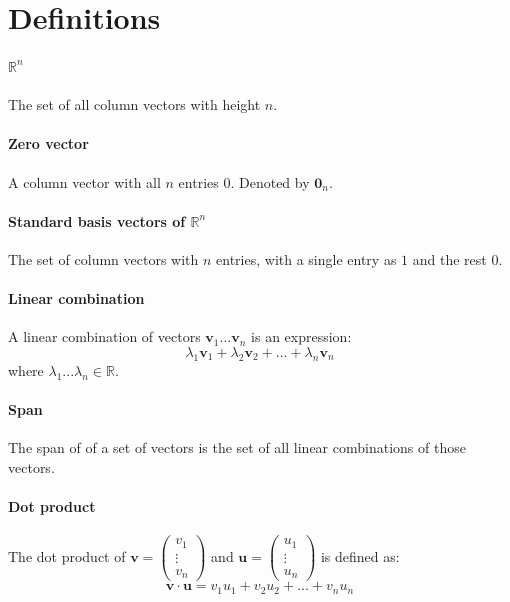 \documentclass{scrartcl}
\newcommand{\R}{\mathbb{R}}
\renewcommand{\vec}[1]{\mathbf{#1}}
\begin{document}
\section{Definitions}

\paragraph{$ \R^{n} $}
The set of all column vectors with height $ n $.

\paragraph{Zero vector}
A column vector with all $ n $ entries $ 0 $. Denoted by $ \vec{0}_{n} $.

\paragraph{Standard basis vectors of $ \R^{n} $}
The set of column vectors with $ n $ entries, with a single entry as $ 1 $ and the rest $ 0 $.

\paragraph{Linear combination}
A linear combination of vectors $ \vec{v}_{1}...\vec{v}_{n} $ is an expression:
\begin{equation}
\lambda_{1} \vec{v}_{1} + \lambda_{2} \vec{v}_{2} + ... + \lambda_{n} \vec{v}_{n}
\end{equation}
where $ \lambda_{1}...\lambda_{n} \in \R $.

\paragraph{Span}
The span of of a set of vectors is the set of all linear combinations of those vectors.

\paragraph{Dot product}
The dot product of $ \vec{v} = \begin{pmatrix}
v_{1} \\ \vdots \\ v_{n}
\end{pmatrix} $ and $ \vec{u} = \begin{pmatrix}
u_{1} \\ \vdots \\ u_{n}
\end{pmatrix} $ is defined as:
\begin{equation}
\vec{v} \cdot \vec{u} = v_{1} u_{1} + v_{2} u_{2} + ... + v_{n} u_{n}
\end{equation}
\end{document}
